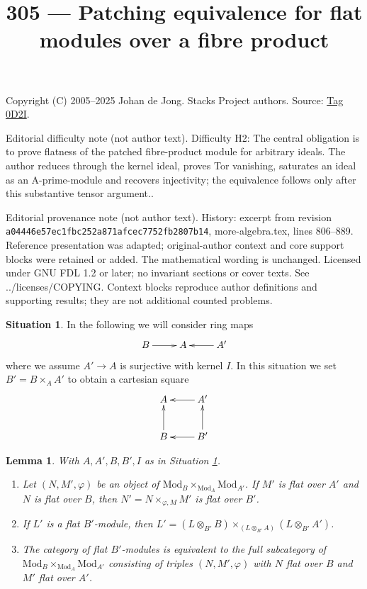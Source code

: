 \documentclass{amsart}
\theoremstyle{plain}
\newtheorem{lemma}[subsection]{Lemma}
\theoremstyle{definition}
\newtheorem{situation}[subsection]{Situation}
\theoremstyle{remark}
\numberwithin{equation}{subsection}
\begin{document}
\title[Stacks Project, Tag 0D2I]{305 --- Patching equivalence for flat modules over a fibre product}
\maketitle
\noindent Copyright (C) 2005--2025 Johan de Jong. Stacks Project authors. Source: \href{https://stacks.math.columbia.edu/tag/0D2I}{Tag 0D2I}.

\noindent Editorial difficulty note (not author text). Difficulty H2: The central obligation is to prove flatness of the patched fibre-product module for arbitrary ideals. The author reduces through the kernel ideal, proves Tor vanishing, saturates an ideal as an A-prime-module and recovers injectivity; the equivalence follows only after this substantive tensor argument..

\noindent Editorial provenance note (not author text). History: excerpt from revision \texttt{a0444\allowbreak 6e57e\allowbreak c1fbc\allowbreak 252a8\allowbreak 71afc\allowbreak ec775\allowbreak 2fb28\allowbreak 07b14}, more-algebra.tex, lines 806--889. Reference presentation was adapted; original-author context and core support blocks were retained or added. The mathematical wording is unchanged. Licensed under GNU FDL 1.2 or later; no invariant sections or cover texts. See ../licenses/COPYING. Context blocks reproduce author definitions and supporting results; they are not additional counted problems.

\begin{situation}
\label{situation-module-over-fibre-product}
In the following we will consider ring maps
$$
\xymatrix{
B \ar[r] & A & A' \ar[l]
}
$$
where we assume $A' \to A$ is surjective with kernel $I$.
In this situation we set $B' = B \times_A A'$ to
obtain a cartesian square
$$
\xymatrix{
A & A' \ar[l] \\
B \ar[u] & B' \ar[l] \ar[u]
}
$$
\end{situation}

\begin{lemma}
\label{lemma-flat-module-over-fibre-product}
With $A, A', B, B', I$ as in
Situation \ref{situation-module-over-fibre-product}.
\begin{enumerate}
\item Let $(N, M', \varphi)$ be an object of
$\text{Mod}_B \times_{\text{Mod}_A} \text{Mod}_{A'}$.
If $M'$ is flat over $A'$ and $N$ is flat over $B$, then
$N' = N \times_{\varphi, M} M'$ is flat over $B'$.
\item If $L'$ is a flat $B'$-module, then
$L' = (L \otimes_{B'} B) \times_{(L \otimes_{B'} A)} (L \otimes_{B'} A')$.
\item The category of flat $B'$-modules is equivalent to the
full subcategory of $\text{Mod}_B \times_{\text{Mod}_A} \text{Mod}_{A'}$
consisting of triples
$(N, M', \varphi)$ with $N$ flat over $B$ and $M'$ flat over $A'$.
\end{enumerate}
\end{lemma}
\end{document}
